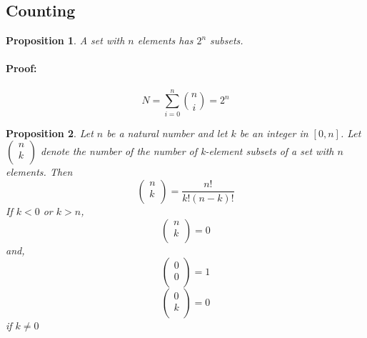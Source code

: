 \documentclass[12pt]{article}
\newtheorem{proposition}{Proposition}[subsection]
\begin{document}
\subsection{Counting}
    \begin{proposition}
        A set with $n$ elements has $2^n$ subsets.
    \end{proposition}
    	\paragraph{Proof:} \[N = \sum_{i = 0}^n \binom{n}{i} = 2^n\]
    
    \begin{proposition}
        Let $n$ be a natural number and let $k$ be an integer in $[0,n]$. Let $\left(\begin{array}{c} n\\k\\\end{array}\right)$ denote the number of the number of k-element subsets of a set with $n$ elements. Then
        \begin{equation}
            \left(\begin{array}{c} n\\k\\\end{array}\right) = \frac{n!}{k!(n-k)!}
        \end{equation}
        If $k < 0$ or $k > n$,
        \begin{equation}
            \left(\begin{array}{c} n\\k\\\end{array}\right) = 0
        \end{equation}
        and,
        \begin{equation}
            \left(\begin{array}{c} 0\\0\\\end{array}\right) = 1
        \end{equation}
        \begin{equation}
            \left(\begin{array}{c} 0\\k\\\end{array}\right) = 0
        \end{equation}
if $k \neq 0$

    \end{proposition}
\end{document}
